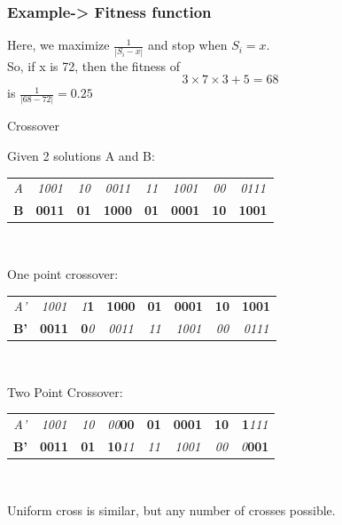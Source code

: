 \documentclass{beamer}
\begin{document}
\begin{frame}
	\frametitle{Example-> Fitness function}
	Here, we maximize $\frac{1}{|S_i-x|}$ and stop when $S_i = x$.\\
	So, if x is 72, then the fitness of $$3 \times 7 \times 3 + 5 = 68$$
	is $\frac{1}{|68-72|} = 0.25$
\end{frame}

\begin{frame}{Crossover}
	
	Given 2 solutions A and B: \\
	\begin{tabular}{|c|c|c|c|c|c|c|c|}
		\hline
		\textit{A} & \textit{1001} & \textit{10} & \textit{0011} & \textit{11} & \textit{1001} & \textit{00} & \textit{0111}\\ 
		\textbf{B} & \textbf{0011} & \textbf{01} & \textbf{1000} & \textbf{01} & \textbf{0001} & \textbf{10} & \textbf{1001}\\
		\hline
	\end{tabular}\\\vspace{3mm}

	One point crossover:\\
	\begin{tabular}{|c|c|c|c|c|c|c|c|}
		\hline
		\textit{A'} & \textit{1001} & \textit{1}\textbf{1} & \textbf{1000} & \textbf{01} & \textbf{0001} & \textbf{10} & \textbf{1001}\\ 
		\textbf{B'} & \textbf{0011} & \textbf{0}\textit{0} & \textit{0011} & \textit{11} & \textit{1001} & \textit{00} & \textit{0111}\\
		\hline
	\end{tabular}\\\vspace{3mm}

Two Point Crossover:\\

\begin{tabular}{|c|c|c|c|c|c|c|c|}
	\hline
	\textit{A'} & \textit{1001} & \textit{10} & \textit{00}\textbf{00}  & \textbf{01} & \textbf{0001} & \textbf{10} & \textbf{1}\textit{111}\\ 
	\textbf{B'} & \textbf{0011} & \textbf{01} & \textbf{10}\textit{11} & \textit{11} & \textit{1001} & \textit{00} & \textit{0}\textbf{001}\\
	\hline
\end{tabular}\\\vspace{3mm}

Uniform cross is similar, but any number of crosses possible.


\end{frame}
\end{document}
